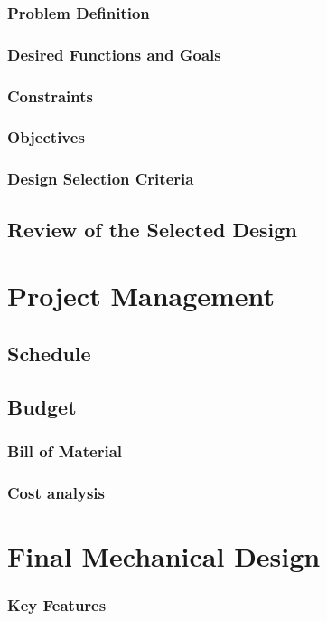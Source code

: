 \documentclass[ece]{uw-wkrpt}
\let\oldsection\section
\renewcommand\section{\clearpage\oldsection}
\begin{document}
\subsubsection{Problem Definition}
\subsubsection{Desired Functions and Goals}
% 
\subsubsection{Constraints}
\subsubsection{Objectives}
% 
\subsubsection{Design Selection Criteria}
% 
\subsection{Review of the Selected Design}
% 
\section{Project Management}
% 
\subsection{Schedule}
% 
\subsection{Budget}
\subsubsection{Bill of Material}
\subsubsection{Cost analysis}
% 
\section{Final Mechanical Design}
\subsubsection{Key Features}
\end{document}
